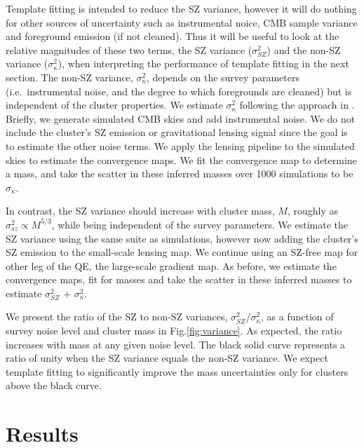 {Template fitting is intended to reduce the SZ variance, however it will do nothing for other sources of uncertainty such as instrumental noice, CMB sample variance and foreground emission (if not cleaned). 
Thus it will be useful to look at the relative magnitudes of these two terms, the SZ variance ($\sigma_{SZ}^{2}$) and the non-SZ variance ($\sigma_{\kappa}^{2}$), when interpreting the performance of template fitting in the next section.
The non-SZ variance, $\sigma_{\kappa}^{2}$, depends on the survey parameters (i.e.~instrumental noise, and the degree to which foregrounds are cleaned) but is independent of the cluster properties. 
We estimate $\sigma_{\kappa}^{2}$ following the approach in \citet{raghunathan18}. 
Briefly, we generate simulated CMB skies and add instrumental noise. 
We do not include the cluster's SZ emission or gravitational lensing signal since the goal is to estimate the other noise terms. 
We apply the lensing pipeline to the simulated skies to estimate the convergence maps. 
We fit the convergence map  to determine  a mass, and take the scatter in these inferred masses over 1000 simulations to be $\sigma_{\kappa}$. 

In contrast, the SZ variance should increase with cluster mass, $M$, roughly as $\sigma_{sz}^2 \propto M^{5/3}$, while being independent of the survey parameters. 
We estimate the SZ variance using the same suite as simulations, however now adding the cluster's SZ emission to the small-scale lensing map. 
We continue using an SZ-free map for other leg of the QE, the large-scale gradient map. 
As before, we estimate the convergence maps, fit for masses and take the scatter in these inferred masses to estimate $\sigma_{SZ}^{2}$ + $\sigma_{\kappa}^{2}$.

We present the ratio of the SZ to non-SZ variances, $\sigma_{SZ}^{2}$/$\sigma_{\kappa}^{2}$, as a function of survey noise level and cluster mass in Fig.\ref{fig:variance}.  
As expected, the ratio increases with mass at any given noise level. 
The black solid curve represents a ratio of unity when the SZ variance equals the non-SZ variance. 
We expect template fitting to significantly improve the mass uncertainties only for clusters above the black curve. 

\section{Results}
\label{sec_results}

}
